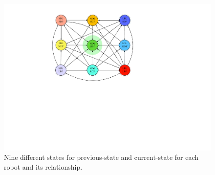 \documentclass[11pt,a4paper]{article}
\begin{document}
 \begin{figure}[h]
     \centering
 \includegraphics[scale=0.7]{Figs/States.pdf}
     \caption{Nine different states for previous-state and current-state for each robot and its relationship.  }
     \label{fig:states}
  \end{figure}
 



\end{document}

